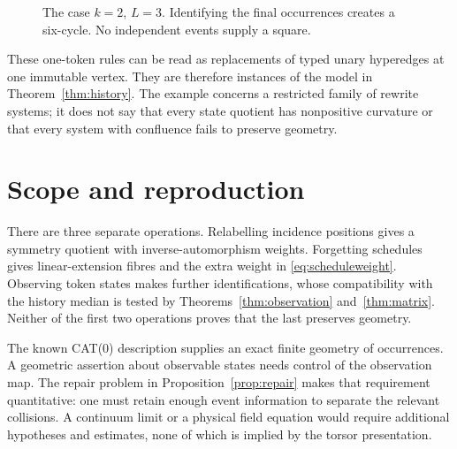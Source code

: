 \documentclass[11pt]{article}
\theoremstyle{definition}
\numberwithin{equation}{section}
\begin{document}
\begin{figure}[ht]
\centering
{}
\caption{The case $k=2$, $L=3$. Identifying the final occurrences
creates a six-cycle. No independent events supply a square.}
\label{fig:cycle}
\end{figure}

These one-token rules can be read as replacements of typed unary
hyperedges at one immutable vertex. They are therefore instances
of the model in Theorem~\ref{thm:history}.
The example concerns a restricted family of rewrite systems; it
does not say that every state quotient has nonpositive curvature
or that every system with confluence fails to preserve geometry.

\section{Scope and reproduction}

There are three separate operations. Relabelling incidence positions
gives a symmetry quotient with inverse-automorphism weights.
Forgetting schedules gives linear-extension fibres and the extra
weight in \eqref{eq:scheduleweight}. Observing token states makes
further identifications, whose compatibility with the history median
is tested by Theorems~\ref{thm:observation} and~\ref{thm:matrix}.
Neither of the first two operations proves that the last preserves
geometry.

The known CAT(0) description supplies an exact finite geometry of
occurrences. A geometric assertion about observable states needs
control of the observation map. The repair problem in
Proposition~\ref{prop:repair} makes that requirement quantitative:
one must retain enough event information to separate the relevant
collisions. A continuum limit or a physical field equation would
require additional hypotheses and estimates, none of which is
implied by the torsor presentation.
\end{document}
